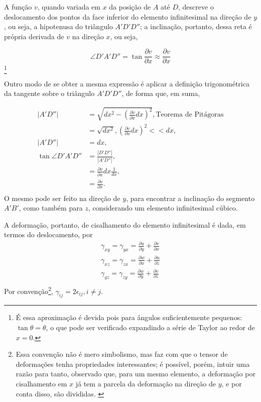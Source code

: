 A função $v$, quando variada em $x$ da posição de $A$ até $D$, descreve o deslocamento dos pontos da face inferior do elemento infinitesimal na direção de $y$, ou seja, a hipotenusa do triângulo $A'D'D''$; a inclinação, portanto, dessa reta é própria derivada de $v$ na direção $x$, ou seja,

\begin{equation}
    \angle D'A'D'' = \tan{\frac{\partial v}{\partial x}} \approx \frac{\partial v}{\partial x}
\end{equation}\footnote{É essa aproximação é devida pois para ângulos suficientemente pequenos: $\tan \theta = \theta$, o que pode ser verificado expandindo a série de Taylor ao redor de $x=0$.}

Outro modo de se obter a mesma expressão é aplicar a definição trigonométrica da tangente sobre o triângulo $A'D'D''$, de forma que, em suma,

\begin{align}
    |A'D''|             &= \sqrt{dx^2 -  \left(\frac{\partial v}{\partial x}dx\right)^2}, \text{Teorema de Pitágoras}\\
                         &= \sqrt{dx^2}, \left(\frac{\partial v}{\partial x}dx\right)^2 << dx,\\
    |A'D''|              &= dx,\\
    \tan{\angle D'A'D''} &= \frac{|D'D''|}{|A'D''|}, \\
                         &= \frac{\partial v}{\partial x}dx \frac{1}{dx},\\
                         & = \frac{\partial v}{\partial x}.\\
\end{align}
O mesmo pode ser feito na direção de $y$, para encontrar a inclinação do segmento $A'B'$, como também para $z$, considerando um elemento infinitesimal cúbico.

A deformação, portanto, de cisalhamento do elemento infinitesimal é dada, em termos do deslocamento, por
\begin{gather}
        \gamma_{xy} = \gamma_{yx} = \frac{\partial u}{\partial y} + \frac{\partial v}{\partial x} \\
        \gamma_{xz} = \gamma_{zx} = \frac{\partial w}{\partial x} + \frac{\partial u}{\partial z} \\
        \gamma_{yz} = \gamma_{zy} = \frac{\partial w}{\partial y} + \frac{\partial v}{\partial z} \\
\end{gather}
Por convenção\footnote{Essa convenção não é mero simbolismo, mas faz com que o tensor de deformações tenha propriedades interessantes; é possível, porém, intuir uma razão para tanto, observado que, para um mesmo elemento, a deformação por cisalhamento em $x$ já tem a parcela da deformação na direção de $y$, e por conta disso, são divididas. \cite{popov} }, $\gamma_{ij} = 2 \epsilon_{ij}, i \neq j$.\cite{roylance} 

